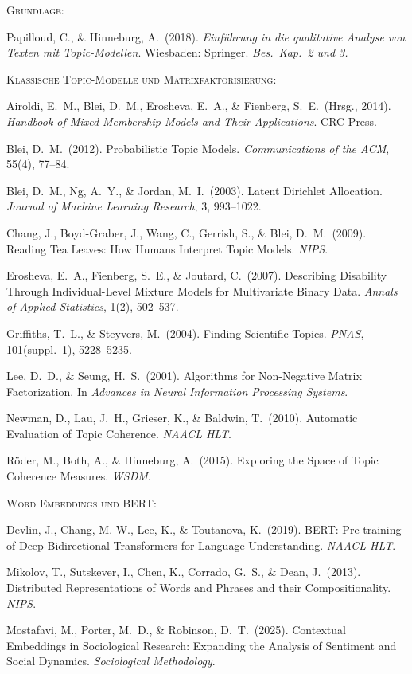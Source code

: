 \documentclass[a4paper,11pt]{article}
\begin{document}
\footnotesize

\textsc{Grundlage:}

Papilloud, C., \& Hinneburg, A.\ (2018). \emph{Einführung in die
qualitative Analyse von Texten mit Topic-Modellen}. Wiesbaden:
Springer. \emph{Bes.\ Kap.\ 2 und 3.}

\bigskip
\textsc{Klassische Topic-Modelle und Matrixfaktorisierung:}

Airoldi, E.\ M., Blei, D.\ M., Erosheva, E.\ A., \& Fienberg, S.\ E.\
(Hrsg., 2014). \emph{Handbook of Mixed Membership Models and Their
Applications}. CRC Press.

Blei, D.\ M.\ (2012). Probabilistic Topic Models.
\emph{Communications of the ACM}, 55(4), 77--84.

Blei, D.\ M., Ng, A.\ Y., \& Jordan, M.\ I.\ (2003). Latent Dirichlet
Allocation. \emph{Journal of Machine Learning Research}, 3, 993--1022.

Chang, J., Boyd-Graber, J., Wang, C., Gerrish, S., \& Blei, D.\ M.\
(2009). Reading Tea Leaves: How Humans Interpret Topic Models.
\emph{NIPS}.

Erosheva, E.\ A., Fienberg, S.\ E., \& Joutard, C.\ (2007). Describing
Disability Through Individual-Level Mixture Models for Multivariate
Binary Data. \emph{Annals of Applied Statistics}, 1(2), 502--537.

Griffiths, T.\ L., \& Steyvers, M.\ (2004). Finding Scientific Topics.
\emph{PNAS}, 101(suppl.\ 1), 5228--5235.

Lee, D.\ D., \& Seung, H.\ S.\ (2001). Algorithms for Non-Negative
Matrix Factorization. In \emph{Advances in Neural Information
Processing Systems}.

Newman, D., Lau, J.\ H., Grieser, K., \& Baldwin, T.\ (2010).
Automatic Evaluation of Topic Coherence. \emph{NAACL HLT}.

Röder, M., Both, A., \& Hinneburg, A.\ (2015). Exploring the Space
of Topic Coherence Measures. \emph{WSDM}.

\bigskip
\textsc{Word Embeddings und BERT:}

Devlin, J., Chang, M.-W., Lee, K., \& Toutanova, K.\ (2019). BERT:
Pre-training of Deep Bidirectional Transformers for Language
Understanding. \emph{NAACL HLT}.

Mikolov, T., Sutskever, I., Chen, K., Corrado, G.\ S., \& Dean, J.\
(2013). Distributed Representations of Words and Phrases and their
Compositionality. \emph{NIPS}.

Mostafavi, M., Porter, M.\ D., \& Robinson, D.\ T.\ (2025). Contextual
Embeddings in Sociological Research: Expanding the Analysis of
Sentiment and Social Dynamics. \emph{Sociological Methodology}.
\end{document}
